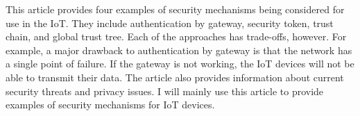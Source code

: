 \documentclass{article}
\newenvironment{annotation}{\begin{addmargin}[2.5em]{0em} \begin{flushleft}}{\end{flushleft} \end{addmargin}}
\begin{document}
\begin{annotation}
This article provides four examples of security mechanisms being considered for use in the IoT. They include authentication by gateway, security token, trust chain, and global trust tree. Each of the 
approaches has trade-offs, however.
For example, a major drawback to authentication by gateway is that the network has a single point of failure. If the gateway is not working, the IoT devices will not be able to transmit their data.
 The article also provides information about current security threats and privacy issues. I will mainly use this article to provide examples of security mechanisms for
IoT devices. 
\end{annotation}
\end{document}
